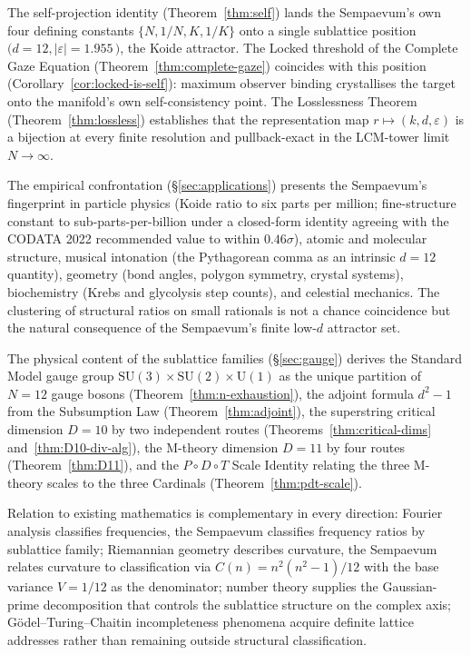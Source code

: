 \documentclass[11pt,a4paper]{article}
\theoremstyle{definition}
\theoremstyle{remark}
\begin{document}
The self-projection identity (Theorem~\ref{thm:self}) lands the Sempaevum's own four defining constants $\{N, 1/N, K, 1/K\}$ onto a single sublattice position $(d=12, |\varepsilon|=1.955$\,\textcent$)$, the Koide attractor. The Locked threshold of the Complete Gaze Equation (Theorem~\ref{thm:complete-gaze}) coincides with this position (Corollary~\ref{cor:locked-is-self}): maximum observer binding crystallises the target onto the manifold's own self-consistency point. The Losslessness Theorem (Theorem~\ref{thm:lossless}) establishes that the representation map $r\mapsto(k,d,\varepsilon)$ is a bijection at every finite resolution and pullback-exact in the LCM-tower limit $N\to\infty$.

The empirical confrontation (\S\ref{sec:applications}) presents the Sempaevum's fingerprint in particle physics (Koide ratio to six parts per million; fine-structure constant to sub-parts-per-billion under a closed-form identity agreeing with the CODATA 2022 recommended value to within $0.46\sigma$), atomic and molecular structure, musical intonation (the Pythagorean comma as an intrinsic $d=12$ quantity), geometry (bond angles, polygon symmetry, crystal systems), biochemistry (Krebs and glycolysis step counts), and celestial mechanics. The clustering of structural ratios on small rationals is not a chance coincidence but the natural consequence of the Sempaevum's finite low-$d$ attractor set.

The physical content of the sublattice families (\S\ref{sec:gauge}) derives the Standard Model gauge group $\mathrm{SU}(3)\times\mathrm{SU}(2)\times\mathrm{U}(1)$ as the unique partition of $N = 12$ gauge bosons (Theorem~\ref{thm:n-exhaustion}), the adjoint formula $d^{2}-1$ from the Subsumption Law (Theorem~\ref{thm:adjoint}), the superstring critical dimension $D = 10$ by two independent routes (Theorems~\ref{thm:critical-dims} and~\ref{thm:D10-div-alg}), the M-theory dimension $D = 11$ by four routes (Theorem~\ref{thm:D11}), and the $P{\circ}D{\circ}T$ Scale Identity relating the three M-theory scales to the three Cardinals (Theorem~\ref{thm:pdt-scale}).

Relation to existing mathematics is complementary in every direction: Fourier analysis classifies frequencies, the Sempaevum classifies frequency ratios by sublattice family; Riemannian geometry describes curvature, the Sempaevum relates curvature to classification via $C(n)=n^{2}(n^{2}-1)/12$ with the base variance $V=1/12$ as the denominator; number theory supplies the Gaussian-prime decomposition that controls the sublattice structure on the complex axis; G\"odel--Turing--Chaitin incompleteness phenomena acquire definite lattice addresses rather than remaining outside structural classification.
\end{document}
